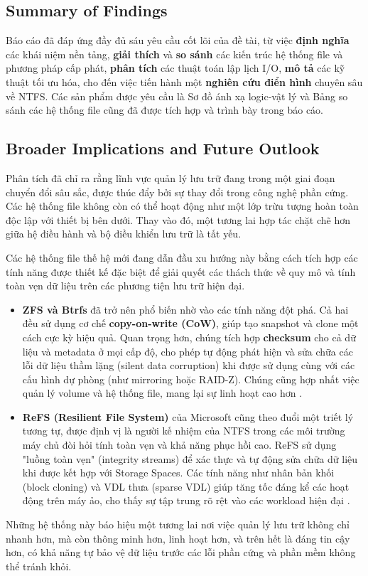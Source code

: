 \documentclass[12pt]{article}
\begin{document}
\subsection{Summary of Findings}
Báo cáo đã đáp ứng đầy đủ sáu yêu cầu cốt lõi của đề tài, từ việc \textbf{định nghĩa} các khái niệm nền tảng, \textbf{giải thích} và \textbf{so sánh} các kiến trúc hệ thống file và phương pháp cấp phát, \textbf{phân tích} các thuật toán lập lịch I/O, \textbf{mô tả} các kỹ thuật tối ưu hóa, cho đến việc tiến hành một \textbf{nghiên cứu điển hình} chuyên sâu về NTFS. Các sản phẩm được yêu cầu là Sơ đồ ánh xạ logic-vật lý và Bảng so sánh các hệ thống file cũng đã được tích hợp và trình bày trong báo cáo.

\subsection{Broader Implications and Future Outlook}
Phân tích đã chỉ ra rằng lĩnh vực quản lý lưu trữ đang trong một giai đoạn chuyển đổi sâu sắc, được thúc đẩy bởi sự thay đổi trong công nghệ phần cứng. Các hệ thống file không còn có thể hoạt động như một lớp trừu tượng hoàn toàn độc lập với thiết bị bên dưới. Thay vào đó, một tương lai hợp tác chặt chẽ hơn giữa hệ điều hành và bộ điều khiển lưu trữ là tất yếu.

Các hệ thống file thế hệ mới đang dẫn đầu xu hướng này bằng cách tích hợp các tính năng được thiết kế đặc biệt để giải quyết các thách thức về quy mô và tính toàn vẹn dữ liệu trên các phương tiện lưu trữ hiện đại.
\begin{itemize}
    \item \textbf{ZFS và Btrfs} đã trở nên phổ biến nhờ vào các tính năng đột phá. Cả hai đều sử dụng cơ chế \textbf{copy-on-write (CoW)}, giúp tạo snapshot và clone một cách cực kỳ hiệu quả. Quan trọng hơn, chúng tích hợp \textbf{checksum} cho cả dữ liệu và metadata ở mọi cấp độ, cho phép tự động phát hiện và sửa chữa các lỗi dữ liệu thầm lặng (silent data corruption) khi được sử dụng cùng với các cấu hình dự phòng (như mirroring hoặc RAID-Z). Chúng cũng hợp nhất việc quản lý volume và hệ thống file, mang lại sự linh hoạt cao hơn \parencite{Nfina2025BtrfsZFS}.
    \item \textbf{ReFS (Resilient File System)} của Microsoft cũng theo đuổi một triết lý tương tự, được định vị là người kế nhiệm của NTFS trong các môi trường máy chủ đòi hỏi tính toàn vẹn và khả năng phục hồi cao. ReFS sử dụng "luồng toàn vẹn" (integrity streams) để xác thực và tự động sửa chữa dữ liệu khi được kết hợp với Storage Spaces. Các tính năng như nhân bản khối (block cloning) và VDL thưa (sparse VDL) giúp tăng tốc đáng kể các hoạt động trên máy ảo, cho thấy sự tập trung rõ rệt vào các workload hiện đại \parencite{Microsoft2025ReFS}.
\end{itemize}
Những hệ thống này báo hiệu một tương lai nơi việc quản lý lưu trữ không chỉ nhanh hơn, mà còn thông minh hơn, linh hoạt hơn, và trên hết là đáng tin cậy hơn, có khả năng tự bảo vệ dữ liệu trước các lỗi phần cứng và phần mềm không thể tránh khỏi.
\end{document}
